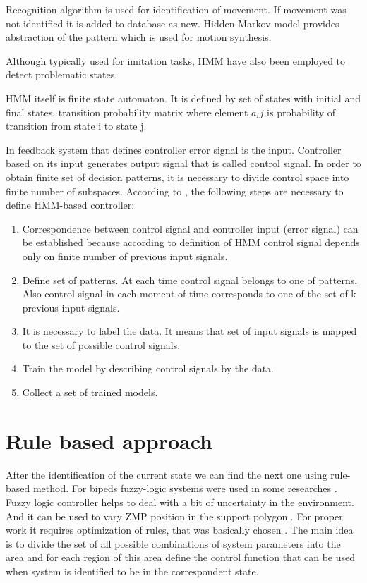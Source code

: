 \documentclass[12pt,a4paper]{report}
\begin{document}
			Recognition algorithm is used for identification of movement. If movement was not identified it is added to database as new. Hidden Markov model provides abstraction of the pattern which is used for motion synthesis.
			
			Although typically used for imitation tasks, HMM have also been employed to detect problematic states.
			
			HMM itself is finite state automaton. It is defined by set of states with initial and final states, transition probability matrix where element $a_ij$ is probability of transition from state i to state j.
			
			In feedback system that defines controller error signal is the input. Controller based on its input generates output signal that is called control signal. In order to obtain finite set of decision patterns, it is necessary to divide control space into finite number of subspaces. According to  \cite{yang1994hidden}, the following steps are necessary to define HMM-based controller:
			
			\begin{enumerate}
				\item
					Correspondence  between control signal and controller input (error signal) can be established because according to definition of HMM control signal depends only on finite number of previous input signals.
				\item 
					Define set of patterns. At each time control signal belongs to one of patterns. Also control signal in each moment of time corresponds to one of the set of k previous input signals.
				\item
					It is necessary to label the data. It means that set of input signals is mapped to the set of possible control signals.
				\item
					Train the model by describing control signals by the data.
				\item
					Collect a set of trained models.
			\end{enumerate} 
			
		\section{Rule based approach}
			After the identification of the current state we can find the next one using rule-based method. For bipeds fuzzy-logic systems were used in some researches \cite{park2003fuzzy}.  Fuzzy logic controller helps to deal with a bit of uncertainty in the environment. And it can be used to vary ZMP position in the support polygon \cite{park2003fuzzy}. For proper work it requires optimization of rules, that was basically chosen \cite{vundavilli2010dynamically}.
			The main idea is to divide the set of all possible combinations of system parameters into the area and for each region of this area define the control function that can be used when system is identified to be in the correspondent state.
		
\end{document}
